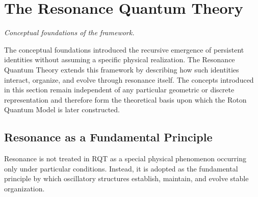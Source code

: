\documentclass[11pt,a4paper]{article}
\begin{document}

\section{The Resonance Quantum Theory}

\emph{Conceptual foundations of the framework.} 
\vspace{0.6em} 

\noindent
The conceptual foundations introduced the recursive emergence of persistent identities without assuming a specific physical realization. The Resonance Quantum Theory extends this framework by describing how such identities interact, organize, and evolve through resonance itself. The concepts introduced in this section remain independent of any particular geometric or discrete representation and therefore form the theoretical basis upon which the Roton Quantum Model is later constructed.

\subsection{Resonance as a Fundamental Principle}
Resonance is not treated in RQT as a special physical phenomenon occurring only under particular conditions. Instead, it is adopted as the fundamental principle by which oscillatory structures establish, maintain, and evolve stable organization.
\end{document}

